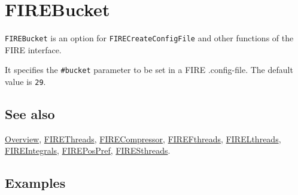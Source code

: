 \documentclass[../FeynHelpersManual.tex]{subfiles}
\begin{document}
\hypertarget{firebucket}{
\section{FIREBucket}\label{firebucket}}

\texttt{FIREBucket} is an option for \texttt{FIRECreateConfigFile} and
other functions of the FIRE interface.

It specifies the \texttt{\#{}\allowbreak{}bucket} parameter to be set in
a FIRE .config-file. The default value is \texttt{29}.

\subsection{See also}

\hyperlink{toc}{Overview}, \hyperlink{firethreads}{FIREThreads},
\hyperlink{firecompressor}{FIRECompressor},
\hyperlink{firefthreads}{FIREFthreads},
\hyperlink{firelthreads}{FIRELthreads},
\hyperlink{fireintegrals}{FIREIntegrals},
\hyperlink{firepospref}{FIREPosPref},
\hyperlink{firesthreads}{FIRESthreads}.

\subsection{Examples}
\end{document}
